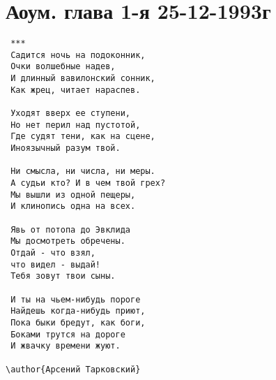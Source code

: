 \chapter{Аоум. глава 1-я 25-12-1993г}
\begin{verbatim}
 ***
 Садится ночь на подоконник,
 Очки волшебные надев,
 И длинный вавилонский сонник,
 Как жрец, читает нараспев.

 Уходят вверх ее ступени,
 Но нет перил над пустотой,
 Где судят тени, как на сцене,
 Иноязычный разум твой.

 Ни смысла, ни числа, ни меры.
 А судьи кто? И в чем твой грех?
 Мы вышли из одной пещеры,
 И клинопись одна на всех.

 Явь от потопа до Эвклида
 Мы досмотреть обречены.
 Отдай - что взял, 
 что видел - выдай!
 Тебя зовут твои сыны.

 И ты на чьем-нибудь пороге
 Найдешь когда-нибудь приют,
 Пока быки бредут, как боги,
 Боками трутся на дороге
 И жвачку времени жуют.

\author{Арсений Тарковский}
\end{verbatim}

\date{26-12-1993г}



